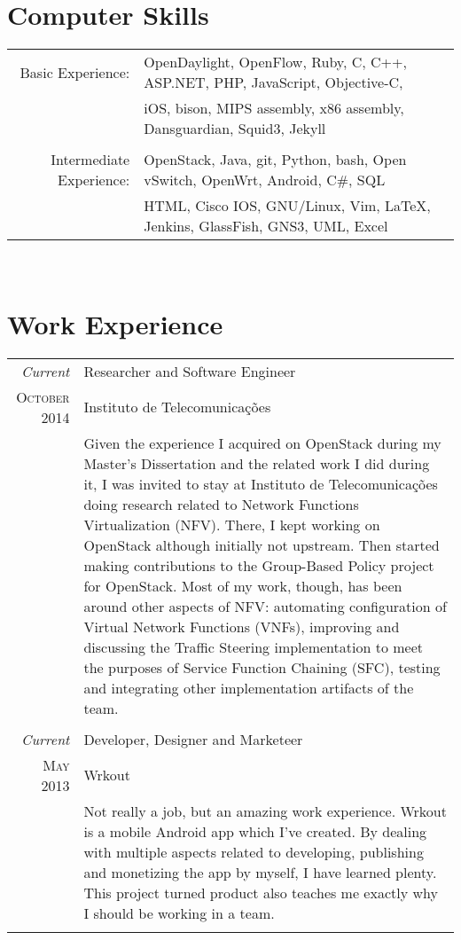 \documentclass[letter,10pt]{article} %
\begin{document}
\section{Computer Skills}

\begin{tabular}{rl}
Basic Experience:
& OpenDaylight, OpenFlow, Ruby, C, C++, ASP.NET, PHP, JavaScript, Objective-C, \\
& iOS, bison, MIPS assembly, x86 assembly, Dansguardian, Squid3, Jekyll\\
& \\
Intermediate Experience:
& OpenStack, Java, git, Python, bash, Open vSwitch, OpenWrt, Android, C\#, SQL\\
& HTML, Cisco IOS, GNU/Linux, Vim, {\LaTeX}, Jenkins, GlassFish, GNS3, UML, Excel\\
\end{tabular} \\


\section{Work Experience}

\begin{tabular}{r|p{11cm}}
	\emph{Current} & Researcher and Software Engineer \\
    \textsc{October 2014} & Instituto de Telecomunicações \\
    & \footnotesize{Given the experience I acquired on OpenStack during my Master's Dissertation and the related work I did during it, I was invited to stay at Instituto de Telecomunicações doing research related to Network Functions Virtualization (NFV). There, I kept working on OpenStack although initially not upstream. Then started making contributions to the Group-Based Policy project for OpenStack. Most of my work, though, has been around other aspects of NFV: automating configuration of Virtual Network Functions (VNFs), improving and discussing the Traffic Steering implementation to meet the purposes of Service Function Chaining (SFC), testing and integrating other implementation artifacts of the team. }\\
	\multicolumn{2}{c}{} \\
	
	\emph{Current} & Developer, Designer and Marketeer \\
	\textsc{May 2013} & Wrkout \\ 
	& \footnotesize{Not really a job, but an amazing work experience. Wrkout is a mobile Android app which I've created. By dealing with multiple aspects related to developing, publishing and monetizing the app by myself, I have learned plenty. This project turned product also teaches me exactly why I should be working in a team.}\\
	\multicolumn{2}{c}{}\\
\end{tabular}
\end{document}
